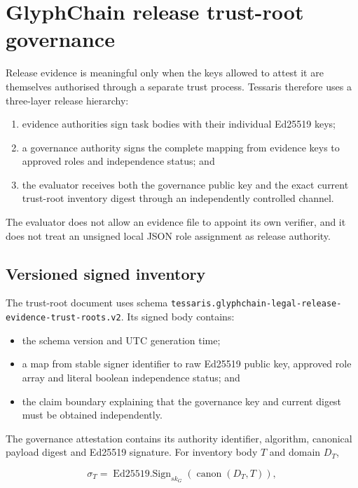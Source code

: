 \section{GlyphChain release trust-root governance}
\label{sec:glyphchain-release-trust-root-governance}

Release evidence is meaningful only when the keys allowed to attest it are
themselves authorised through a separate trust process.  Tessaris therefore uses a
three-layer release hierarchy:

\begin{enumerate}
  \item evidence authorities sign task bodies with their individual Ed25519 keys;
  \item a governance authority signs the complete mapping from evidence keys to
        approved roles and independence status; and
  \item the evaluator receives both the governance public key and the exact current
        trust-root inventory digest through an independently controlled channel.
\end{enumerate}

The evaluator does not allow an evidence file to appoint its own verifier, and it
does not treat an unsigned local JSON role assignment as release authority.

\subsection{Versioned signed inventory}

The trust-root document uses schema
\texttt{tessaris.glyphchain-legal-release-evidence-trust-roots.v2}.  Its signed body
contains:

\begin{itemize}
  \item the schema version and UTC generation time;
  \item a map from stable signer identifier to raw Ed25519 public key, approved role
        array and literal boolean independence status; and
  \item the claim boundary explaining that the governance key and current digest
        must be obtained independently.
\end{itemize}

The governance attestation contains its authority identifier, algorithm, canonical
payload digest and Ed25519 signature.  For inventory body $T$ and domain $D_T$,

\begin{equation}
  \sigma_T = \operatorname{Ed25519.Sign}_{sk_G}
  \left(\operatorname{canon}(D_T,T)\right),
\end{equation}

